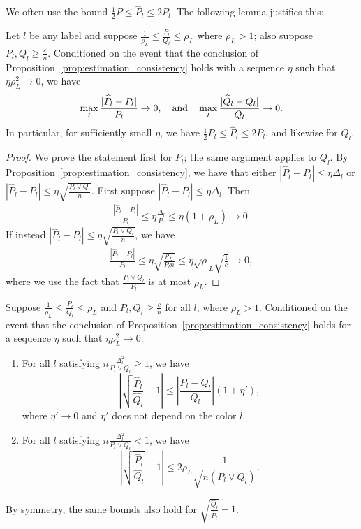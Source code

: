\documentclass{article}
\begin{document}
We often use the bound $\frac{1}{2} P \leq \hat{P}_l \leq 2 P_l$. The following lemma justifies this:
\begin{lemma}
\label{lem:bound_ratio_P_Pl}
Let $l$ be any label and suppose $\frac{1}{\rho_L} \leq \frac{P_l}{Q_l} \leq \rho_L$ where $\rho_L > 1$; also suppose $P_l, Q_l \geq \frac{c}{n}$. Conditioned on the event that the 
conclusion of Proposition~\ref{prop:estimation_consistency} holds with a sequence $\eta$ such that $\eta \rho_L^2 \rightarrow 0$, we have
\[
\max_l \frac{|\widehat{P}_l - P_l|}{P_l} \rightarrow 0,
\quad \textrm{and} \quad
\max_l \frac{|\widehat{Q}_l - Q_l|}{Q_l} \rightarrow 0.
\]
In particular, for sufficiently small $\eta$, we have $\frac{1}{2} P_l \leq \hat{P}_l \leq 2P_l$, and likewise for $Q_l$.
\end{lemma}


\begin{proof}

We prove the statement first for $P_l$; the same argument applies to $Q_l$. By Proposition~\ref{prop:estimation_consistency}, we have that either $| \hat{P}_l - P_l | \leq \eta \Delta_l$ or $| \hat{P}_l - P_l | \leq \eta \sqrt{ \frac{P_l \vee Q_l}{n} }$. First suppose $| \hat{P}_l - P_l | \leq \eta \Delta_l$. Then
\begin{align*}
\frac{ | \hat{P}_l - P_l |}{P_l} \leq \eta \frac{\Delta_l}{P_l} \leq \eta (1+\rho_L) \rightarrow 0.
\end{align*}
If instead $| \hat{P}_l - P_l | \leq \eta \sqrt{ \frac{P_l \vee Q_l}{n} }$, we have
\begin{align*}
\frac{| \hat{P}_l - P_l |}{P_l} \leq \eta \sqrt{ \frac{\rho_L}{ P_l n}} \leq \eta \sqrt \rho_L \sqrt{ \frac{1}{c}} \rightarrow 0,
\end{align*}
where we use the fact that $\frac{P_l \vee Q_l}{P_l}$ is at most $\rho_L$.
\end{proof}



\begin{lemma}
\label{lem:sqrt_ratio_pl_ql_minus_1}
Suppose $\frac{1}{\rho_L} \leq \frac{P_l}{Q_l} \leq \rho_L$ and $P_l, Q_l \geq \frac{c}{n}$ for all $l$, where $\rho_L > 1$. Conditioned on the event that the 
conclusion of Proposition~\ref{prop:estimation_consistency} holds for a sequence $\eta$ such that $\eta \rho_L^2 \rightarrow 0$:
\begin{enumerate}
\item 
For all $l$ satisfying  $n \frac{\Delta_l^2}{P_l \vee Q_l} \geq 1$, we have  
\[
\left| \sqrt{ \frac{\hat{P}_l }{\hat{Q}_l} } - 1 \right|
                    \leq \left| \frac{P_l - Q_l}{Q_l} \right| (1 + \eta'),
\]
where $\eta' \rightarrow 0$ and $\eta'$ does not depend on the color $l$. 

\item
For all $l$ satisfying $n \frac{\Delta_l^2}{P_l \vee Q_l} < 1$, we have
\[
\left| \sqrt{ \frac{\hat{P}_l}{\hat{Q}_l} } - 1 \right| \leq
 2 \rho_L \frac{1}{\sqrt{n  (P_l \vee Q_l) } }.
\]

\end{enumerate}
By symmetry, the same bounds also hold for $\sqrt{ \frac{\hat{Q}_l}{\hat{P}_l}} - 1$.
\end{lemma}
\end{document}
